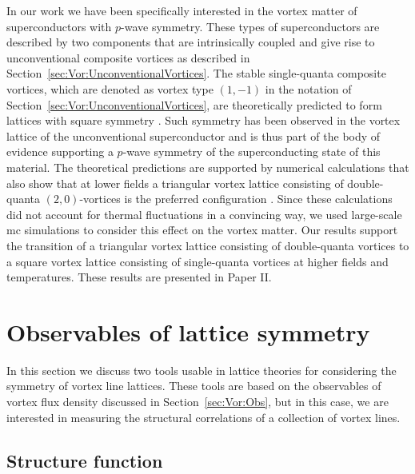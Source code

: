 In our work we have been specifically interested in the vortex matter of superconductors with $p$-wave symmetry. These types of superconductors are described by two components that are intrinsically
coupled and give rise to unconventional composite vortices as described in Section~\ref{sec:Vor:UnconventionalVortices}. The stable single-quanta composite vortices, which are denoted
as vortex type $(1, -1)$ in the notation of Section~\ref{sec:Vor:UnconventionalVortices}, are theoretically predicted to form lattices with square symmetry \cite{Agterberg00,Heeb99,AgterbergVortex98}.
Such symmetry has been observed in the vortex lattice of the unconventional superconductor  \cite{Riseman98,Aegerter98,Ray14,Curran11} and is thus part of the body of evidence
supporting a $p$-wave symmetry of the superconducting state of this material. The theoretical predictions are supported by numerical calculations that also show that at lower fields
a triangular vortex lattice consisting of double-quanta $(2,0)$-vortices is the preferred configuration \cite{AsleGaraud16}. Since these calculations did not account for thermal fluctuations in
a convincing way, we used large-scale \ac{mc} simulations to consider this effect on the vortex matter. Our results support the transition of a triangular vortex lattice consisting of
double-quanta vortices to a square vortex lattice consisting of single-quanta vortices at higher fields and temperatures. These results are presented in Paper II.

\section{Observables of lattice symmetry}
\label{sec:Vor:Symm}

In this section we discuss two tools usable in lattice theories for considering the symmetry of vortex line lattices. These tools are based on the observables of vortex flux density discussed
in Section~\ref{sec:Vor:Obs}, but in this case, we are interested in measuring the structural correlations of a collection of vortex lines.

\subsection{Structure function}
\label{sec:Vor:Symm:SF}

